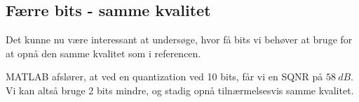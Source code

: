 \subsection{Færre bits - samme kvalitet}
Det kunne nu være interessant at undersøge, hvor få bits vi behøver at bruge for at opnå den samme kvalitet som i referencen. 

MATLAB afslører, at ved en quantization ved 10 bits, får vi en SQNR på $58\ dB$. Vi kan altså bruge 2 bits mindre, og stadig opnå tilnærmelsesvis samme kvalitet.




